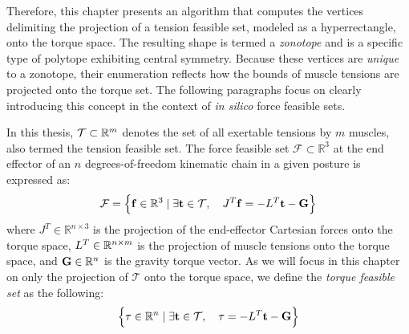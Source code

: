 Therefore, this chapter presents an algorithm that computes the vertices delimiting the projection of a tension feasible set, modeled as a hyperrectangle, onto the torque space. The resulting shape is termed a \emph{zonotope} and is a specific type of polytope exhibiting central symmetry. Because these vertices are \emph{unique} to a zonotope, their enumeration reflects how the bounds of muscle tensions are projected onto the torque set. The following paragraphs focus on clearly introducing this concept in the context of \emph{in silico} force feasible sets.

In this thesis, $\mathcal{T}\subset \mathbb{R}^m$ denotes the set of all exertable tensions by $m$ muscles, also termed the tension feasible set. The force feasible set $\mathcal{F}\subset \mathbb{R}^3$ at the end effector of an $n$ degrees-of-freedom kinematic chain in a given posture is expressed as:
\begin{align*}
    \mathcal{F} = \left\{\mathbf{f}\in\mathbb{R}^3\mid \exists \mathbf{t}\in \mathcal{T},\quad J^T\mathbf{f} = -L^T\mathbf{t} - \mathbf{G}\right\}
\end{align*}
where $J^T\in \mathbb{R}^{n\times 3}$ is the projection of the end-effector Cartesian forces onto the torque space, $L^T\in \mathbb{R}^{n\times m}$ is the projection of muscle tensions onto the torque space, and $\mathbf{G}\in\mathbb{R}^n$ is the gravity torque vector.
As we will focus in this chapter on only the projection of $\mathcal{T}$ onto the torque space, we define the \emph{torque feasible set} as the following:
\begin{align*}
    \left\{\tau \in \mathbb{R}^n \mid \exists \mathbf{t}\in\mathcal{T}, \quad \tau = -L^T\mathbf{t} - \mathbf{G}\right\}
\end{align*}

